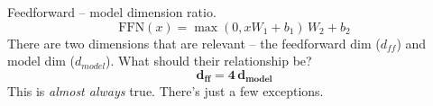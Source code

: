 Feedforward -- model dimension ratio.
\[ \text{FFN}(x) = \max(0, xW_1 + b_1)\,W_2 + b_2 \]
There are two dimensions that are relevant -- the feedforward dim ($d_{ff}$) and model dim ($d_{model}$). What should their relationship be?
\[ \boldsymbol{d_{ff} = 4\, d_{model}} \]
This is \emph{almost always} true. There's just a few exceptions.
